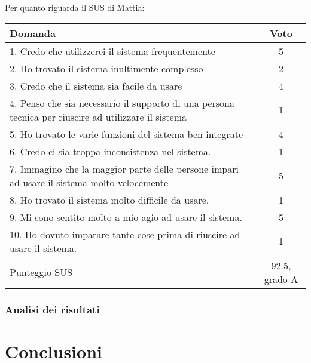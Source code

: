 \documentclass[../Report.tex]{subfiles}
\begin{document}
    Per quanto riguarda il SUS di Mattia:
    \begin{table}[H]
        \begin{tabular}{|p{10cm}|c|}
            \hline
            \textbf{Domanda} & \textbf{Voto}\\
            \hline
            1. Credo che utilizzerei il sistema frequentemente & 5\\
            \hline
            2. Ho trovato il sistema inultimente complesso & 2 \\
            \hline
            3. Credo che il sistema sia facile da usare & 4 \\
            \hline
            4. Penso che sia necessario il supporto di una persona tecnica per riuscire ad utilizzare il sistema & 1 \\
            \hline
            5. Ho trovato le varie funzioni del sistema ben integrate & 4 \\
            \hline
            6. Credo ci sia troppa inconsistenza nel sistema. & 1\\
            \hline
            7. Immagino che la maggior parte delle persone impari ad usare il sistema molto velocemente & 5 \\
            \hline
            8. Ho trovato il sistema molto difficile da usare. & 1 \\
            \hline
            9. Mi sono sentito molto a mio agio ad usare il sistema. & 5\\
            \hline
            10. Ho dovuto imparare tante cose prima di riuscire ad usare il sistema. & 1 \\ 
            \hline
            Punteggio SUS & 92.5, grado A \\
            \hline
        \end{tabular}
    \end{table}
    \subsection{Analisi dei risultati}

    \chapter{Conclusioni}
\end{document}
